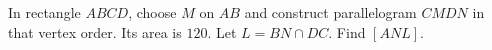 In rectangle $ABCD$, choose $M$ on $AB$ and construct parallelogram $CMDN$ in that vertex order. Its area is $120$. Let $L=BN\cap DC$. Find $[ANL]$.
